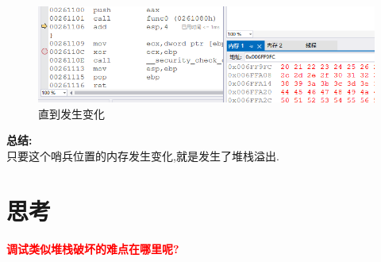 \documentclass[AutoFakeBold,AutoFakeSlant]{beamer}
\begin{document}
	\begin{frame} 
		\begin{figure}
			\centering %
			\includegraphics[width=\linewidth]{1211memwatch3}
			\caption{直到发生变化}
			\label{fig:1211memwatch2}
		\end{figure}
	\end{frame}
	
	\begin{frame} 
		\textbf{总结:}\\
		只要这个哨兵位置的内存发生变化,就是发生了堆栈溢出.
	\end{frame}
		
	\section{思考}
	\begin{frame} 
		\textcolor{red}{\textbf{调试类似堆栈破坏的难点在哪里呢?}} 
	\end{frame}
	
\end{document}
